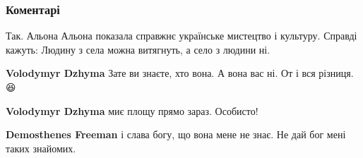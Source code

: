  
 
 
 
 
\subsubsection{Коментарі}

\begin{itemize}
 

Так. Альона Альона показала справжнє українське мистецтво і культуру. Справді
кажуть: Людину з села можна витягнуть, а село з людини ні.

\begin{itemize}
 
\textbf{Volodymyr Dzhyma} Зате ви знаєте, хто вона. А вона вас ні. От і вся різниця. 😆


 
\textbf{Volodymyr Dzhyma} миє площу прямо зараз. Особисто!

 
\textbf{Demosthenes Freeman} і слава богу, що вона мене не знає. Не дай бог мені таких знайомих.

 

\end{itemize}
\end{itemize}
